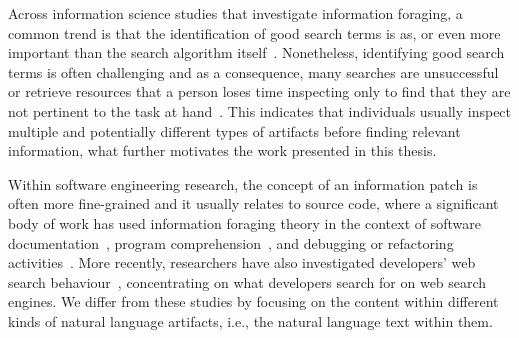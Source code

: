 









Across information science studies that investigate information foraging, 
a common trend is that the identification of good search terms is as, or even more
important than the search algorithm itself~\cite{Kevic2014}. 
Nonetheless, identifying good search terms is often challenging and 
as a consequence, many searches are unsuccessful or retrieve resources that 
a person loses time inspecting only to find that they are not pertinent to the task at hand~\cite{novotny2004don, Haiduc2013}.
This indicates that individuals usually inspect multiple and potentially different types of artifacts 
before finding relevant information, what further motivates the work presented in this thesis.




Within software engineering research, the concept of an information patch 
is often more fine-grained and it usually relates to source code, where a significant body of work has 
used information foraging theory in the context of software documentation~\cite{Forward2002, DeGraaf2014, Wildemuth2012},
program comprehension~\cite{piorkowski2013, Ko2006a}, and debugging or refactoring activities~\cite{fleming2013, lawrance2010}. 
More recently, researchers have also investigated developers' web search 
behaviour~\cite{Starke2009, Brandt2009a, Xia2017}, concentrating on what developers search for on web search engines. 
We differ from these studies by focusing 
on the content within different kinds of natural language artifacts, i.e., 
the natural language text within them.






